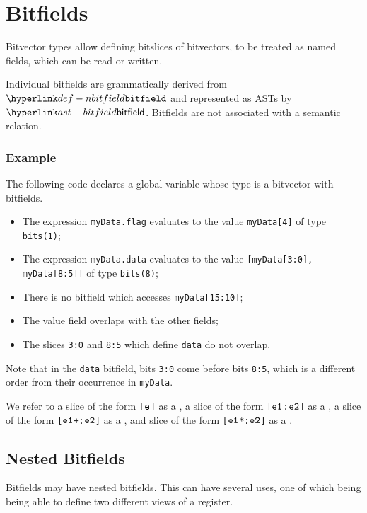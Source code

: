 \chapter{Bitfields\label{chap:Bitfields}}

Bitvector types allow defining bitslices of bitvectors, to be treated as named
fields, which can be read or written. 

Individual bitfields are grammatically derived from $\Nbitfield$ and represented as ASTs by $\bitfield$.
Bitfields are not associated with a semantic relation.

\subsection{Example}
The following code declares a global variable whose type is a bitvector with bitfields.
\begin{itemize}
  \item The expression \texttt{myData.flag} evaluates to the value \texttt{myData[4]} of type \texttt{bits(1)};
  \item The expression \texttt{myData.data} evaluates to the value \texttt{[myData[3:0], myData[8:5]]} of type \texttt{bits(8)};
  \item There is no bitfield which accesses \texttt{myData[15:10]};
  \item The value field overlaps with the other fields;
  \item The slices \texttt{3:0} and \texttt{8:5} which define \texttt{data} do not overlap.
\end{itemize}
Note that in the \texttt{data} bitfield, bits \texttt{3:0} come before bits \texttt{8:5},
which is a different order from their occurrence in \texttt{myData}.

\hypertarget{def-singleslice}{}
\hypertarget{def-rangeslice}{}
\hypertarget{def-lengthslice}{}
\hypertarget{def-scaledslice}{}
We refer to a slice of the form \texttt{[$\texttt{e}$]} as a \singleslice,
a slice of the form \texttt{[$\texttt{e1}$:$\texttt{e2}$]} as a \rangeslice,
a slice of the form \texttt{[$\texttt{e1}$+:$\texttt{e2}$]} as a \lengthslice,
and slice of the form \texttt{[$\texttt{e1}$*:$\texttt{e2}$]} as a \scaledslice.

\section{Nested Bitfields}
Bitfields may have nested bitfields. This can have several uses, one of which being being able to define two
different views of a register.

